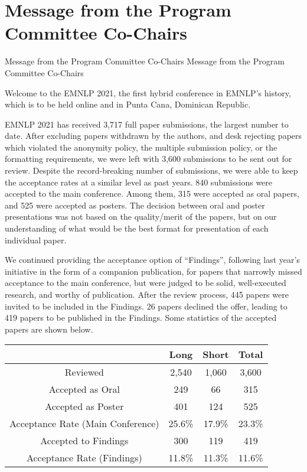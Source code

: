 \section{Message from the Program Committee Co-Chairs}
\setheaders%
    {Message from the Program Committee Co-Chairs}%
    {Message from the Program Committee Co-Chairs}
\thispagestyle{emptyheader}

\setlength{\parskip}{.7ex}


Welcome to the EMNLP 2021, the first hybrid conference in EMNLP's history, which is to be held online and in Punta Cana, Dominican Republic.

EMNLP 2021 has received 3,717 full paper submissions, the largest number to date. After excluding papers withdrawn by the authors, and desk rejecting papers which violated the anonymity policy, the multiple submission policy, or the formatting requirements, we were left with 3,600 submissions to be sent out for review. Despite the record-breaking number of submissions, we were able to keep the acceptance rates at a similar level as past years. 840 submissions were accepted to the main conference. Among them, 315 were accepted as oral papers, and 525 were accepted as posters. The decision between oral and poster presentations was not based on the quality/merit of the papers, but on our understanding of what would be the best format for presentation of each individual paper.

We continued providing the acceptance option of ``Findings'', following last year's initiative in the form of a companion publication, for papers that narrowly missed acceptance to the main conference, but were judged to be solid, well-executed research, and worthy of publication. After the review process, 445 papers were invited to be included in the Findings. 26 papers declined the offer, leading to 419 papers to be published in the Findings. Some statistics of the accepted papers are shown below.


\begin{table}[h]
    \begin{center}
\begin{tabular}[h]{|c|c|c|c|}
\hline
    &Long & Short & Total \\
\hline
    Reviewed & 2,540 &1,060  &3,600   \\
\hline
    Accepted as Oral & 249& 66 & 315   \\
\hline
    Accepted as Poster & 401 & 124 & 525  \\
   \hline
    Acceptance Rate (Main Conference) & 25.6\% & 17.9\% & 23.3\%  \\
\hline
   Accepted to Findings & 300 & 119 & 419  \\
 \hline
    Acceptance Rate (Findings) & 11.8\% & 11.3\% & 11.6\%  \\
\hline
\end{tabular}
    \end{center}
\end{table}

